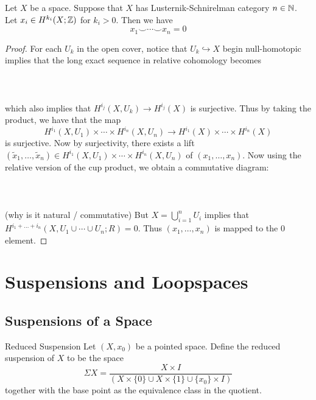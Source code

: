 \documentclass[a4paper]{article}
\begin{document}
\begin{prp}{}{} Let $X$ be a space. Suppose that $X$ has Lusternik-Schnirelman category $n\in\mathbb{N}$. Let $x_i\in H^{k_i}(X;\mathbb{Z})$ for $k_i>0$. Then we have $$x_1\smile\cdots\smile x_n=0$$ \tcbline
\begin{proof}
For each $U_k$ in the open cover, notice that $U_k\hookrightarrow X$ begin null-homotopic implies that the long exact sequence in relative cohomology becomes \\~\\
\\~\\
which also implies that $H^{i_j}(X,U_k)\to H^{i_j}(X)$ is surjective. Thus by taking the product, we have that the map $$H^{i_1}(X,U_1)\times\cdots\times H^{i_n}(X,U_n)\to H^{i_1}(X)\times\cdots\times H^{i_n}(X)$$ is surjective. Now by surjectivity, there exists a lift $(\tilde{x}_1,\dots,\tilde{x}_n)\in H^{i_1}(X,U_1)\times\cdots\times H^{i_n}(X,U_n)$ of $(x_1,\dots,x_n)$. Now using the relative version of the cup product, we obtain a commutative diagram: \\~\\
\\~\\
(why is it natural / commutative) But $X=\bigcup_{i=1}^nU_i$ implies that $H^{i_1+\dots+i_n}(X,U_1\cup\cdots\cup U_n;R)=0$. Thus $(x_1,\dots,x_n)$ is mapped to the $0$ element. 
\end{proof}
\end{prp}

\pagebreak
\section{Suspensions and Loopspaces}
\subsection{Suspensions of a Space}
\begin{defn}{Reduced Suspension}{} Let $(X,x_0)$ be a pointed space. Define the reduced suspension of $X$ to be the space $$\Sigma X=\frac{X\times I}{(X\times\{0\}\cup X\times\{1\}\cup\{x_0\}\times I)}$$ together with the base point as the equivalence class in the quotient. 
\end{defn}
\end{document}
